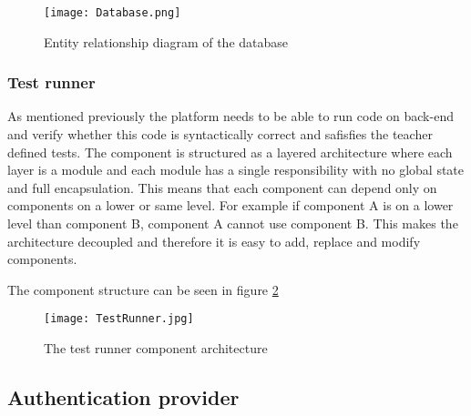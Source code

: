 \begin{figure}[H]
	\texttt{[image: Database.png]}
	\centering
	\caption{Entity relationship diagram of the database}
	\label{fig:Database}
\end{figure}


\subsubsection{Test runner}
As mentioned previously the platform needs to be able to run code on back-end and verify whether this code is syntactically correct and safisfies the teacher defined tests.
The component is structured as a layered architecture where each layer is a module and each module has a single responsibility with no global state and full encapsulation.
This means that each component can depend only on components on a lower or same level. For example if component A is on a lower level than component B, component A cannot use component B.
This makes the architecture decoupled and therefore it is easy to add, replace and modify components.

The component structure can be seen in figure \ref{fig:TestRunner}

\begin{figure}[H]
	\texttt{[image: TestRunner.jpg]}
	\centering
	\caption{The test runner component architecture}
	\label{fig:TestRunner}
\end{figure}

\subsection{Authentication provider}


